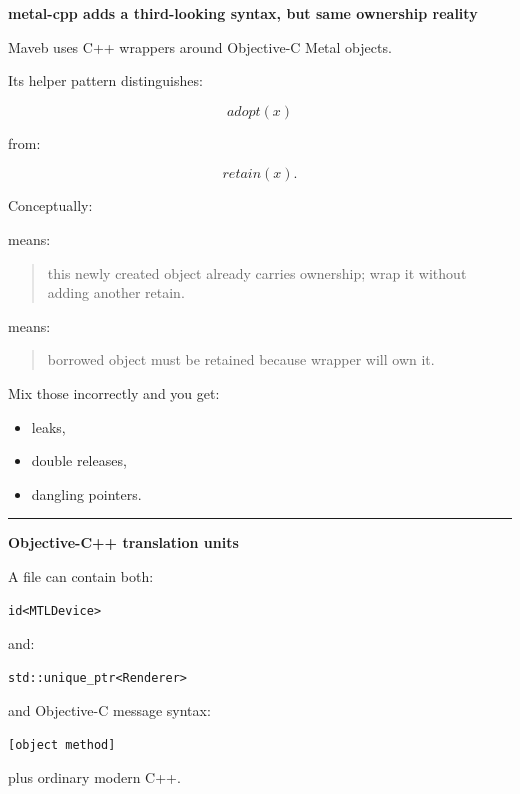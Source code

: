 \textbf{metal-cpp adds a third-looking syntax, but same ownership reality}

Maveb uses C++ wrappers around Objective-C Metal objects.

Its helper pattern distinguishes:

\[
adopt(x)
\]

from:

\[
retain(x).
\]

Conceptually:

 means:

\begin{quote}
this newly created object already carries ownership; wrap it without adding another retain.
\end{quote}

 means:

\begin{quote}
borrowed object must be retained because wrapper will own it.
\end{quote}

Mix those incorrectly and you get:

\begin{itemize}
\tightlist
\item
  leaks,
\item
  double releases,
\item
  dangling pointers.
\end{itemize}

\begin{center}\rule{0.5\linewidth}{0.5pt}\end{center}

\textbf{Objective-C++  translation units}

A  file can contain both:

\begin{verbatim}
id<MTLDevice>
\end{verbatim}

and:

\begin{verbatim}
std::unique_ptr<Renderer>
\end{verbatim}

and Objective-C message syntax:

\begin{verbatim}
[object method]
\end{verbatim}

plus ordinary modern C++.

